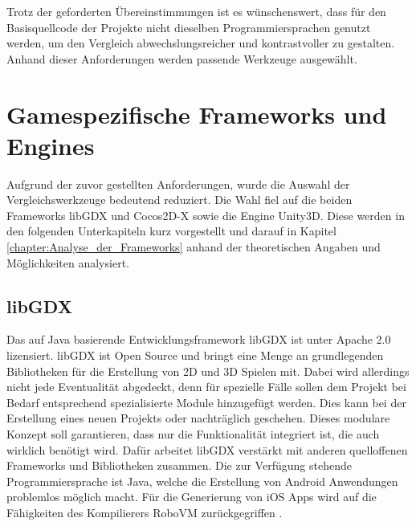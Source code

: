 \bigskip
Trotz der geforderten Übereinstimmungen ist es wünschenswert, dass für den Basisquellcode der Projekte nicht dieselben Programmiersprachen genutzt werden, um den Vergleich abwechslungsreicher und kontrastvoller zu gestalten. Anhand dieser Anforderungen werden passende Werkzeuge ausgewählt.


\section{Gamespezifische Frameworks und Engines}
Aufgrund der zuvor gestellten Anforderungen, wurde die Auswahl der Vergleichswerkzeuge bedeutend reduziert. Die Wahl fiel auf die beiden Frameworks libGDX und Cocos2D-X sowie die Engine Unity3D. Diese werden in den folgenden Unterkapiteln kurz vorgestellt und darauf in Kapitel \ref{chapter:Analyse_der_Frameworks} anhand der theoretischen Angaben und Möglichkeiten analysiert.

\subsection{libGDX}
Das auf Java basierende Entwicklungsframework libGDX ist unter Apache 2.0 lizensiert.  libGDX ist Open Source und bringt eine Menge an grundlegenden Bibliotheken für die Erstellung von 2D und 3D Spielen mit. Dabei wird allerdings nicht jede Eventualität abgedeckt, denn für spezielle Fälle sollen dem Projekt bei Bedarf entsprechend spezialisierte Module hinzugefügt werden. Dies kann bei der Erstellung eines neuen Projekts oder nachträglich geschehen. Dieses modulare Konzept soll garantieren, dass nur die Funktionalität integriert ist, die auch wirklich benötigt wird. Dafür arbeitet libGDX verstärkt mit anderen quelloffenen Frameworks und Bibliotheken zusammen. Die zur Verfügung stehende Programmiersprache ist Java, welche die Erstellung von Android Anwendungen problemlos möglich macht. Für die Generierung von iOS Apps wird auf die Fähigkeiten des Kompilierers RoboVM zurückgegriffen \citep{libGDX_main_features}. 


